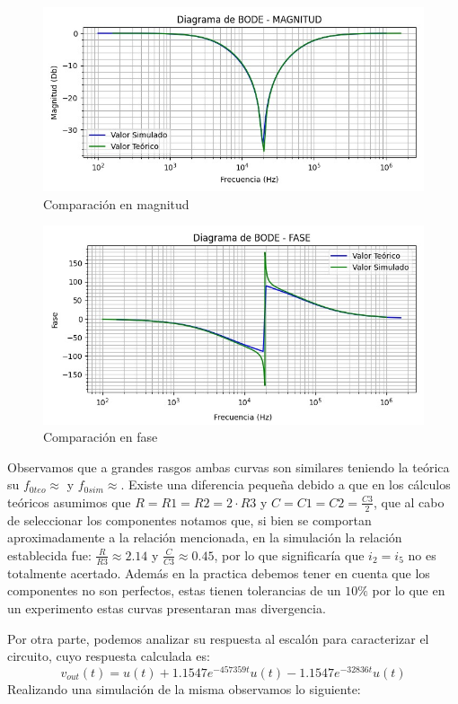 \begin{figure}[H]
\centering
\includegraphics[scale=0.7]{Bode Magnitud.jpeg}
\caption{Comparación en magnitud}
\end{figure}

\begin{figure}[H]
\centering
\includegraphics[scale=0.7]{Bode Fase.jpeg}
\caption{Comparación en fase}
\end{figure}


Observamos que a grandes rasgos ambas curvas son similares teniendo la teórica su $f_{0teo} \approx $ y $f_{0sim} \approx $. Existe una diferencia pequeña debido a que en los cálculos teóricos asumimos que $R = R1 = R2 = 2 \cdot R3$ y $C = C1 = C2 = \frac{C3}{2}$, que al cabo de seleccionar los componentes notamos que, si bien se comportan aproximadamente a la relación mencionada, en la simulación la relación establecida fue: $\frac{R}{R3} \approx 2.14$ y $\frac{C}{C3} \approx 0.45$, por lo que significaría que $i_2 = i_5$ no es totalmente acertado. Además en la practica debemos tener en cuenta que los componentes no son perfectos, estas tienen tolerancias de un $10\%$ por lo que en un experimento estas curvas presentaran mas divergencia.

Por otra parte, podemos analizar su respuesta al escalón para caracterizar el circuito, cuyo respuesta calculada es: $$v_{out}(t) = u(t) + 1.1547e^{-457359t}u(t) - 1.1547e^{-32836t}u(t)$$
Realizando una simulación de la misma observamos lo siguiente:

